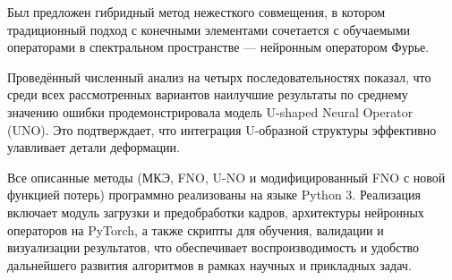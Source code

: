 \documentclass[12pt]{article}
\begin{document}
Был предложен гибридный метод нежесткого совмещения, в котором традиционный подход с конечными элементами сочетается с обучаемыми операторами в спектральном пространстве — нейронным оператором Фурье.

Проведённый численный анализ на четырх последовательностях показал, что среди всех рассмотренных вариантов наилучшие результаты по среднему значению ошибки продемонстрировала модель U-shaped Neural Operator (UNO). Это подтверждает, что интеграция U-образной структуры эффективно улавливает детали деформации.

Все описанные методы (МКЭ, FNO, U-NO и модифицированный FNO с новой функцией потерь) программно реализованы на языке Python 3. Реализация включает модуль загрузки и предобработки кадров, архитектуры нейронных операторов на PyTorch, а также скрипты для обучения, валидации и визуализации результатов, что обеспечивает воспроизводимость и удобство дальнейшего развития алгоритмов в рамках научных и прикладных задач.





\end{document}
